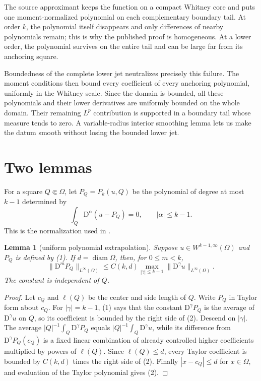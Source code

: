 \documentclass[11pt]{article}
\newtheorem{lemma}[theorem]{Lemma}
\newcommand{\Om}{\Omega}
\newcommand{\D}{\mathrm D}
\begin{document}
The source approximant keeps the function on a compact Whitney core and puts
one moment-normalized polynomial on each complementary boundary tail.  At
order $k$, the polynomial itself disappears and only differences of nearby
polynomials remain; this is why the published proof is homogeneous.  At a
lower order, the polynomial survives on the entire tail and can be large far
from its anchoring square.

Boundedness of the complete lower jet neutralizes precisely this failure.
The moment conditions then bound every coefficient of every anchoring
polynomial, uniformly in the Whitney scale.  Since the domain is bounded, all
these polynomials and their lower derivatives are uniformly bounded on the
whole domain.  Their remaining $L^p$ contribution is supported in a boundary
tail whose measure tends to zero.  A variable-radius interior smoothing lemma
lets us make the datum smooth without losing the bounded lower jet.

\section{Two lemmas}

For a square $Q\Subset\Om$, let $P_Q=P_k(u,Q)$ be the polynomial of degree at
most $k-1$ determined by
\[
 \int_Q \D^\alpha(u-P_Q)=0,
 \qquad |\alpha|\leq k-1.                                      \tag{1}
\]
This is the normalization used in \cite{NRS}.

\begin{lemma}[uniform polynomial extrapolation]\label{lem:poly}
Suppose $u\in W^{k-1,\infty}(\Om)$ and $P_Q$ is defined by (1).  If
$d=\operatorname{diam}\Om$, then, for $0\leq m<k$,
\[
 \|\D^mP_Q\|_{L^\infty(\Om)}
 \leq C(k,d)\max_{|\gamma|\leq k-1}
               \|\D^\gamma u\|_{L^\infty(\Om)}.              \tag{2}
\]
The constant is independent of $Q$.
\end{lemma}

\begin{proof}
Let $c_Q$ and $\ell(Q)$ be the center and side length of $Q$.  Write $P_Q$ in
Taylor form about $c_Q$.  For $|\gamma|=k-1$, (1) says that the constant
$\D^\gamma P_Q$ is the average of $\D^\gamma u$ on $Q$, so its coefficient is
bounded by the right side of (2).  Descend on $|\gamma|$.  The average
$|Q|^{-1}\int_Q\D^\gamma P_Q$ equals
$|Q|^{-1}\int_Q\D^\gamma u$, while its difference from
$\D^\gamma P_Q(c_Q)$ is a fixed linear combination of already controlled
higher coefficients multiplied by powers of $\ell(Q)$.  Since
$\ell(Q)\leq d$, every Taylor coefficient is bounded by $C(k,d)$ times the
right side of (2).  Finally $|x-c_Q|\leq d$ for $x\in\Om$, and evaluation of
the Taylor polynomial gives (2).
\end{proof}
\end{document}
